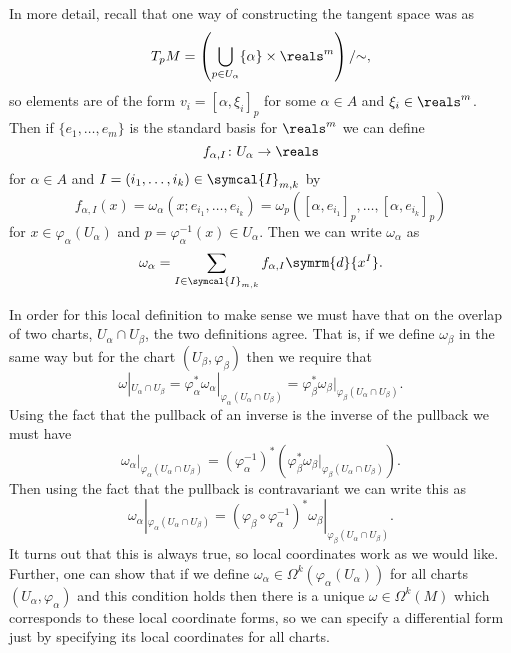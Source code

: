 \documentclass[fleqn]{NotesClass}
\renewcommand{\dl}{\symrm{d}}
\begin{document}
    In more detail, recall that one way of constructing the tangent space was as
    \begin{equation}
        T_pM = \left( \bigcup_{p \in U_\alpha} \{\alpha\} \times \reals^m \right) / {\sim},
    \end{equation}
    so elements are of the form \(v_i = [\alpha, \xi_i]_p\) for some \(\alpha \in A\) and \(\xi_i \in \reals^m\).
    Then if \(\{e_1, \dotsc, e_m\}\) is the standard basis for \(\reals^m\) we can define
    \begin{equation}
        f_{\alpha, I} \colon U_\alpha \to \reals
    \end{equation}
    for \(\alpha \in A\) and \(I = (i_1, \dotsc, i_k) \in \symcal{I}_{m,k}\) by
    \begin{equation}
        f_{\alpha,I}(x) = \omega_\alpha(x; e_{i_1}, \dotsc, e_{i_k}) = \omega_p([\alpha, e_{i_1}]_p, \dotsc, [\alpha, e_{i_k}]_p)
    \end{equation}
    for \(x \in \varphi_\alpha(U_\alpha)\) and \(p = \varphi_\alpha^{-1}(x) \in U_\alpha\).
    Then we can write \(\omega_\alpha\) as
    \begin{equation}
        \omega_\alpha = \sum_{I \in \symcal{I}_{m,k}} f_{\alpha, I} \dl{x^I}.
    \end{equation}
    
    In order for this local definition to make sense we must have that on the overlap of two charts, \(U_\alpha \cap U_\beta\), the two definitions agree.
    That is, if we define \(\omega_\beta\) in the same way but for the chart \((U_\beta, \varphi_\beta)\) then we require that
    \begin{equation}
        \omega|_{U_\alpha \cap U_\beta} = \varphi_\alpha^*\omega_\alpha|_{\varphi_\alpha(U_\alpha \cap U_\beta)} = \varphi_\beta^*\omega_\beta|_{\varphi_\beta(U_\alpha \cap U_\beta)}.
    \end{equation}
    Using the fact that the pullback of an inverse is the inverse of the pullback we must have
    \begin{equation}
        \omega_\alpha|_{\varphi_\alpha(U_\alpha \cap U_\beta)} = (\varphi_\alpha^{-1})^* (\varphi_\beta^* \omega_\beta|_{\varphi_\beta(U_\alpha \cap U_\beta)}).
    \end{equation}
    Then using the fact that the pullback is contravariant we can write this as
    \begin{equation}
        \omega_\alpha|_{\varphi_\alpha(U_\alpha \cap U_\beta)} = (\varphi_\beta \circ \varphi_\alpha^{-1})^*\omega_\beta|_{\varphi_\beta(U_\alpha \cap U_\beta)}.
    \end{equation}
    It turns out that this is always true, so local coordinates work as we would like.
    Further, one can show that if we define \(\omega_\alpha \in \Omega^k(\varphi_\alpha(U_\alpha))\) for all charts \((U_\alpha, \varphi_\alpha)\) and this condition holds then there is a unique \(\omega \in \Omega^k(M)\) which corresponds to these local coordinate forms, so we can specify a differential form just by specifying its local coordinates for all charts.
    
\end{document}
